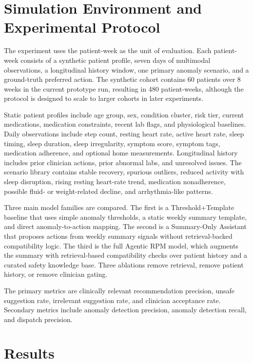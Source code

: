 \documentclass[conference]{IEEEtran}
\begin{document}
\section{Simulation Environment and Experimental Protocol}

The experiment uses the patient-week as the unit of evaluation. Each patient-week consists of a synthetic patient profile, seven days of multimodal observations, a longitudinal history window, one primary anomaly scenario, and a ground-truth preferred action. The synthetic cohort contains 60 patients over 8 weeks in the current prototype run, resulting in 480 patient-weeks, although the protocol is designed to scale to larger cohorts in later experiments.

Static patient profiles include age group, sex, condition cluster, risk tier, current medications, medication constraints, recent lab flags, and physiological baselines. Daily observations include step count, resting heart rate, active heart rate, sleep timing, sleep duration, sleep irregularity, symptom score, symptom tags, medication adherence, and optional home measurements. Longitudinal history includes prior clinician actions, prior abnormal labs, and unresolved issues. The scenario library contains stable recovery, spurious outliers, reduced activity with sleep disruption, rising resting heart-rate trend, medication nonadherence, possible fluid- or weight-related decline, and arrhythmia-like patterns.

Three main model families are compared. The first is a Threshold+Template baseline that uses simple anomaly thresholds, a static weekly summary template, and direct anomaly-to-action mapping. The second is a Summary-Only Assistant that proposes actions from weekly summary signals without retrieval-backed compatibility logic. The third is the full Agentic RPM model, which augments the summary with retrieval-based compatibility checks over patient history and a curated safety knowledge base. Three ablations remove retrieval, remove patient history, or remove clinician gating.

The primary metrics are clinically relevant recommendation precision, unsafe suggestion rate, irrelevant suggestion rate, and clinician acceptance rate. Secondary metrics include anomaly detection precision, anomaly detection recall, and dispatch precision.

\section{Results}
\end{document}
